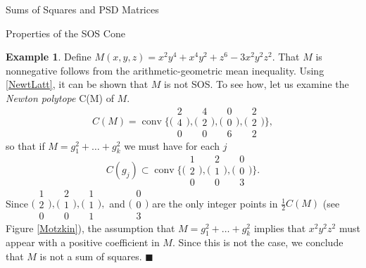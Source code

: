 \documentclass[12pt,oneside,final]{ucthesisucsbmath2010}
\newcommand{\QED}{\blacksquare}
\DeclareMathOperator{\conv}{conv}
\theoremstyle{definition}
\newtheorem{examp}[thm]{Example}
\begin{document}
\begin{chapter}{Sums of Squares and PSD Matrices}
\begin{section}{Properties of the SOS Cone}
\begin{examp}Define $M(x,y,z) = x^2y^4+x^4y^2+z^6-3x^2y^2z^2$. That $M$ is nonnegative follows from the arithmetic-geometric mean inequality. Using \ref{NewtLatt}, it can be shown that $M$ is not SOS. To see how, let us examine the \emph{Newton polytope} C(M) of $M$. 
\[C(M) = \conv \Big \{\Big(\begin{smallmatrix}2\\4\\0\end{smallmatrix}\Big),\Big(\begin{smallmatrix}4\\2\\0\end{smallmatrix}\Big),\Big(\begin{smallmatrix}0\\0\\6\end{smallmatrix}\Big),\Big(\begin{smallmatrix}2\\2\\2\end{smallmatrix}\Big)\Big\},\]so that if $M=g_1^2+\ldots+g_k^2$ we must have for each $j$ \[C(g_j) \subset \conv \Big \{\Big(\begin{smallmatrix}1\\2\\0\end{smallmatrix}\Big),\Big(\begin{smallmatrix}2\\1\\0\end{smallmatrix}\Big),\Big(\begin{smallmatrix}0\\0\\3\end{smallmatrix}\Big)\Big\}. \]
Since $\Big(\begin{smallmatrix}1\\2\\0\end{smallmatrix}\Big),\Big(\begin{smallmatrix}2\\1\\0\end{smallmatrix}\Big),\Big(\begin{smallmatrix}1\\1\\1\end{smallmatrix}\Big),$ and $\Big(\begin{smallmatrix}0\\0\\3\end{smallmatrix}\Big)$ are the only integer points in $\tfrac{1}{2}C(M)$ (see Figure \ref{Motzkin}), the assumption that $M=g_1^2+\ldots+g_k^2$ implies that $x^2y^2z^2$ must appear with a positive coefficient in $M$. Since this is not the case, we conclude that $M$ is not a sum of squares.
$\QED$
\end{examp}


\end{section}
\end{chapter}
\end{document}
